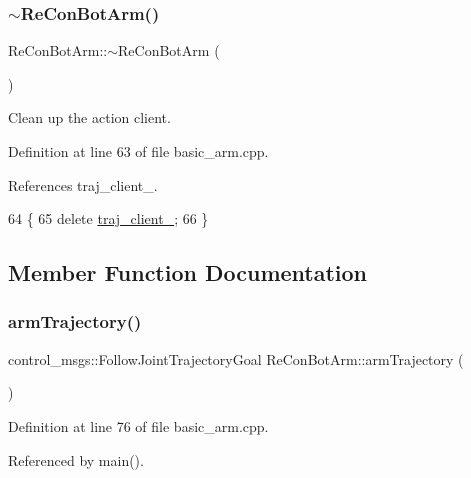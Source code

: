 \subsubsection{\texorpdfstring{$\sim$\+Re\+Con\+Bot\+Arm()}{~ReConBotArm()}}
{\footnotesize\ttfamily Re\+Con\+Bot\+Arm\+::$\sim$\+Re\+Con\+Bot\+Arm (\begin{DoxyParamCaption}{ }\end{DoxyParamCaption})\hspace{0.3cm}{\ttfamily [inline]}}



Clean up the action client. 



Definition at line 63 of file basic\+\_\+arm.\+cpp.



References traj\+\_\+client\+\_\+.


\begin{DoxyCode}
64   \{
65   \textcolor{keyword}{delete} \hyperlink{class_re_con_bot_arm_a0be83821f776c5ca9874fabbeaa177cf}{traj\_client\_};
66   \}
\end{DoxyCode}


\subsection{Member Function Documentation}
\mbox{\label{class_re_con_bot_arm_ac499ee22d73b90c860f06a16afcd2fb0}} 
\subsubsection{\texorpdfstring{arm\+Trajectory()}{armTrajectory()}}
{\footnotesize\ttfamily control\+\_\+msgs\+::\+Follow\+Joint\+Trajectory\+Goal Re\+Con\+Bot\+Arm\+::arm\+Trajectory (\begin{DoxyParamCaption}{ }\end{DoxyParamCaption})\hspace{0.3cm}{\ttfamily [inline]}}



Definition at line 76 of file basic\+\_\+arm.\+cpp.



Referenced by main().


